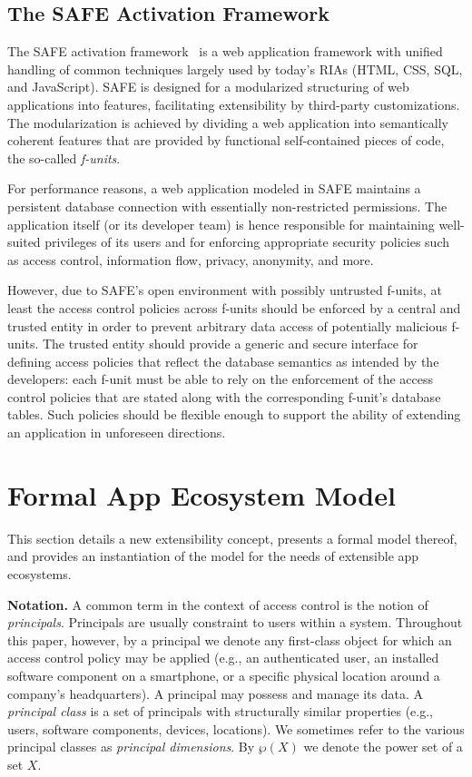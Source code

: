 \documentclass{src/acm_proc_article-sp} \else
\newcommand\myparagraph[1]{\medskip\noindent\textbf{#1.}}
\newcommand\SAFE{SAFE\xspace}
\begin{document}
\subsection{The SAFE Activation Framework}

The \SAFE activation
framework~\cite{Reischuk12:SAFE,Reischuk12:SAFEmanual} is a
web application framework with unified handling of common
techniques largely used by today's RIAs (HTML, CSS, SQL, and
JavaScript). \SAFE is designed for a modularized structuring
of web applications into features, facilitating
extensibility by third-party customizations. The
modularization is achieved by dividing a web application
into semantically coherent features that are provided by
functional self-contained pieces of code, the so-called
\emph{f-units}.





For performance reasons, a web application modeled in \SAFE
maintains a persistent database connection with essentially
non-restricted permissions. The application itself (or its
developer team) is hence responsible for maintaining
well-suited privileges of its users and for enforcing
appropriate security policies such as access control,
information flow, privacy, anonymity, and more.

However, due to \SAFE's open environment with possibly
untrusted f-units, at least the access control policies
across f-units should be enforced by a central and trusted entity in order
to prevent arbitrary data access of potentially malicious
f-units. The trusted entity should provide a generic and
secure interface for defining access policies that reflect
the database semantics as intended by the developers: each
f-unit must be able to rely on the enforcement of the access
control policies that are stated along with the
corresponding f-unit's database tables. Such policies should
be flexible enough to support the ability of extending an
application in unforeseen directions.
   \section{Formal App Ecosystem Model}
\label{sec:model}



This section details a new extensibility concept, presents a
formal model thereof, and provides an instantiation of the
model for the needs of extensible app ecosystems.

\myparagraph{Notation} A common term in the context of
access control is the notion of \emph{principals}.
Principals are usually constraint to users within a system.
Throughout this paper, however, by a principal we denote any
first-class object for which an access control policy may be
applied (e.g., an authenticated user, an installed software
component on a smartphone, or a specific physical location
around a company's headquarters). A principal may possess
and manage its data. A \emph{principal class} is a set of
principals with structurally similar properties (e.g.,
users, software components, devices, locations). We
sometimes refer to the various principal classes as
\emph{principal dimensions}. By $\wp(X)$ we denote the power
set of a set $X$.
\end{document}
